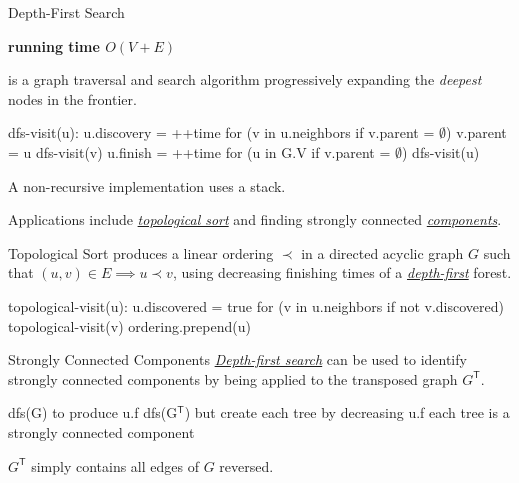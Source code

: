 \documentclass{cognito}
\begin{document}
\begin{note}{Depth-First Search}
	\begin{mdframed}[linecolor=black!25!white]
		\bf running time $O(V + E)$
	\end{mdframed}
	 is a graph traversal and search algorithm progressively expanding the \emph{deepest} nodes in the frontier.
	\begin{largecode}
 dfs-visit(u):
	u.discovery = ++time
	for (v in u.neighbors if v.parent = $\emptyset$)
		v.parent = u
		dfs-visit(v)
	u.finish = ++time
 for (u in G.V if v.parent = $\emptyset$) dfs-visit(u)
	\end{largecode}%
	\begin{remark} A non-recursive implementation uses a stack. \end{remark}
	\begin{remark}
	Applications include \hyperref[note:Topological Sort]{\it topological sort}
	and finding strongly connected \hyperref[note:Strongly Connected Components]{\it components}. \end{remark}
	\vspace{-5pt}
\end{note}

\begin{note}{Topological Sort}
	 produces a linear ordering $\prec$ in a directed acyclic graph $G$
	such that $(u, v) \in E \implies u \prec v$, using decreasing finishing times of a \hyperref[note:Depth-First Search]{\it depth-first} forest.
	
	\begin{largecode}
 topological-visit(u):
	u.discovered = true
	for (v in u.neighbors if not v.discovered)
		topological-visit(v)
	ordering.prepend(u)
	\end{largecode}
	\vspace{-5pt}
\end{note}

\begin{note}{Strongly Connected Components}
	\hyperref[note:Depth-First Search]{\it Depth-first search} can be used to identify strongly connected components
	by being applied to the transposed graph $G^\mathsf{T}$.
	\begin{largecode}
 dfs(G) to produce u.f
 dfs(G$^\mathsf{T}$) but create each tree by decreasing u.f
 each tree is a strongly connected component
	\end{largecode}%
	\begin{remark} $G^\mathsf{T}$ simply contains all edges of $G$ reversed.\end{remark}\vspace{-5pt}
\end{note}
\end{document}
